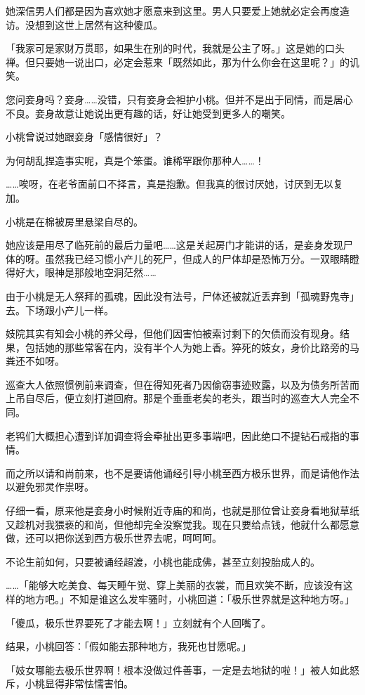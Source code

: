 \documentclass[portrait,a4paper]{article}
\begin{document}
她深信男人们都是因为喜欢她才愿意来到这里。男人只要爱上她就必定会再度造访。没想到这世上居然有这种傻瓜。

「我家可是家财万贯耶，如果生在别的时代，我就是公主了呀。」这是她的口头禅。但只要她一说出口，必定会惹来「既然如此，那为什么你会在这里呢？」的讥笑。

您问妾身吗？妾身……没错，只有妾身会袒护小桃。但并不是出于同情，而是居心不良。妾身故意让她说出更有趣的话，好让她受到更多人的嘲笑。

小桃曾说过她跟妾身「感情很好」？

为何胡乱捏造事实呢，真是个笨蛋。谁稀罕跟你那种人……！

……唉呀，在老爷面前口不择言，真是抱歉。但我真的很讨厌她，讨厌到无以复加。

小桃是在棉被房里悬梁自尽的。

她应该是用尽了临死前的最后力量吧……这是关起房门才能讲的话，是妾身发现尸体的呀。虽然我已经习惯小产儿的死尸，但成人的尸体却是恐怖万分。一双眼睛瞪得好大，眼神是那般地空洞茫然……

由于小桃是无人祭拜的孤魂，因此没有法号，尸体还被就近丢弃到「孤魂野鬼寺」去。下场跟小产儿一样。

妓院其实有知会小桃的养父母，但他们因害怕被索讨剩下的欠债而没有现身。结果，包括她的那些常客在内，没有半个人为她上香。猝死的妓女，身价比路旁的马粪还不如呀。

巡查大人依照惯例前来调查，但在得知死者乃因偷窃事迹败露，以及为债务所苦而上吊自尽后，便立刻打道回府。那是个垂垂老矣的老头，跟当时的巡查大人完全不同。

老鸨们大概担心遭到详加调查将会牵扯出更多事端吧，因此绝口不提钻石戒指的事情。

而之所以请和尚前来，也不是要请他诵经引导小桃至西方极乐世界，而是请他作法以避免邪灵作祟呀。

仔细一看，原来他是妾身小时候附近寺庙的和尚，也就是那位曾让妾身看地狱草纸又趁机对我猥亵的和尚，但他却完全没察觉我。现在只要给点钱，他就什么都愿意做，还可以把你送到西方极乐世界去呢，呵呵呵。

不论生前如何，只要被诵经超渡，小桃也能成佛，甚至立刻投胎成人的。

……「能够大吃美食、每天睡午觉、穿上美丽的衣裳，而且欢笑不断，应该没有这样的地方吧。」不知是谁这么发牢骚时，小桃回道：「极乐世界就是这种地方呀。」

「傻瓜，极乐世界要死了才能去啊！」立刻就有个人回嘴了。

结果，小桃回答：「假如能去那种地方，我死也甘愿呢。」

「妓女哪能去极乐世界啊！根本没做过件善事，一定是去地狱的啦！」被人如此怒斥，小桃显得非常怯懦害怕。
\end{document}
